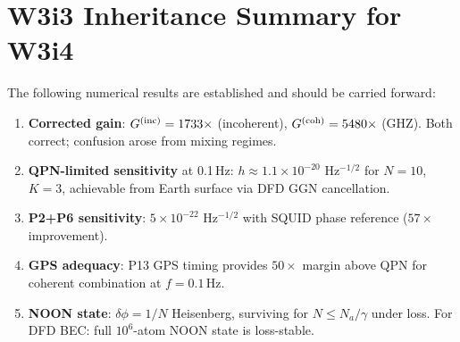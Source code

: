 \documentclass[11pt]{article}
\theoremstyle{definition}
\theoremstyle{remark}
\begin{document}
\section*{W3i3 Inheritance Summary for W3i4}

The following numerical results are established and should be carried forward:

\begin{enumerate}
\item \textbf{Corrected gain}: $G^{(\rm inc)} = 1733\times$ (incoherent),
  $G^{(\rm coh)} = 5480\times$ (GHZ). Both correct; confusion arose from
  mixing regimes.
\item \textbf{QPN-limited sensitivity} at 0.1\,Hz: $h \approx 1.1\times10^{-20}$
  Hz$^{-1/2}$ for $N=10$, $K=3$, achievable from Earth surface via DFD
  GGN cancellation.
\item \textbf{P2+P6 sensitivity}: $5\times10^{-22}$ Hz$^{-1/2}$ with SQUID
  phase reference ($57\times$ improvement).
\item \textbf{GPS adequacy}: P13 GPS timing provides $50\times$ margin above
  QPN for coherent combination at $f = 0.1$\,Hz.
\item \textbf{NOON state}: $\delta\phi = 1/N$ Heisenberg, surviving for $N \leq
  N_a / \gamma$ under loss. For DFD BEC: full $10^6$-atom NOON state is loss-stable.
\end{enumerate}
\end{document}
